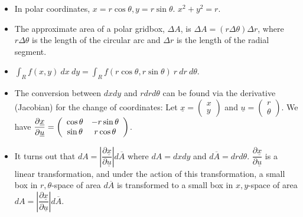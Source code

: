 \documentclass[12pt,letterpaper,noanswers]{exam}
\begin{document}
\begin{tcolorbox}

\begin{itemize}
\itemsep0em
    \item In polar coordinates, $x = r\cos\theta, y = r\sin\theta$.  $x^2+y^2 = r$.  
    \item The approximate area of a polar gridbox, $\Delta A$, is $\Delta A = (r\Delta\theta)\Delta r$, where $r\Delta\theta$ is the length of the circular arc and $\Delta r$ is the length of the radial segment.
    \item $\int_R f(x,y)\ dx\ dy = \int_R f(r\cos\theta,r\sin\theta)\ r\ dr\ d\theta$.
    \end{itemize}
    \end{tcolorbox}
    \begin{tcolorbox}

\begin{itemize}
\itemsep0em
    
    \item The conversion between $dxdy$ and $rdrd\theta$ can be found via the derivative (Jacobian) for the change of coordinates: Let $\underline x = \left(\begin{array}{c} x \\ y \end{array}\right)$ and $\underline u = \left(\begin{array}{c} r \\ \theta \end{array}\right)$.  We have $\dfrac{\partial \underline x}{\partial \underline u} = \left(\begin{array}{c c} \cos\theta & -r\sin\theta \\ \sin\theta & r\cos\theta \end{array}\right)$.  
    \item It turns out that $dA = 
    \left\vert\dfrac{\partial \underline x}{\partial \underline u}\right\vert d\overline{A}$ where $dA = dxdy$ and $d\overline{A} = drd\theta$.  $\dfrac{\partial \underline x}{\partial \underline u}$ is a linear transformation, and under the action of this transformation, a small box in $r,\theta$-space of area $d\overline{A}$ is transformed to a small box in $x,y$-space of area $dA = \left\vert\dfrac{\partial \underline x}{\partial \underline u}\right\vert d\overline{A}$.
\end{itemize}
\end{tcolorbox}
\end{document}
